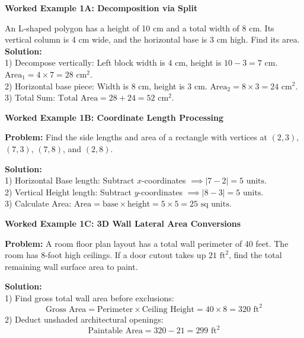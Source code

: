\documentclass[12pt, letterpaper, fleqn]{article}
\begin{document}
\begin{tcolorbox}[colback=white, colframe=black!25, boxrule=0.6pt, arc=4mm, left=6mm, right=6mm, top=4mm, bottom=4mm]
\textbf{Worked Example 1A: Decomposition via Split}

\medskip
\noindent
An L-shaped polygon has a height of 10 cm and a total width of 8 cm. Its vertical column is 4 cm wide, and the horizontal base is 3 cm high. Find its area.\\
\textbf{Solution:} \\
1) Decompose vertically: Left block width is $4\text{ cm}$, height is $10 - 3 = 7\text{ cm}$. $\text{Area}_1 = 4 \times 7 = 28\text{ cm}^2$.\\
2) Horizontal base piece: Width is $8\text{ cm}$, height is $3\text{ cm}$. $\text{Area}_2 = 8 \times 3 = 24\text{ cm}^2$.\\
3) Total Sum: $\text{Total Area} = 28 + 24 = 52\text{ cm}^2$.
\end{tcolorbox}

\vspace{3mm}

\begin{tcolorbox}[colback=white, colframe=black!25, boxrule=0.6pt, arc=4mm, left=6mm, right=6mm, top=4mm, bottom=4mm]
\textbf{Worked Example 1B: Coordinate Length Processing}

\medskip
\noindent
\textbf{Problem:} Find the side lengths and area of a rectangle with vertices at $(2, 3)$, $(7, 3)$, $(7, 8)$, and $(2, 8)$.

\medskip
\noindent
\textbf{Solution:} \\
1) Horizontal Base length: Subtract $x$-coordinates $\implies |7 - 2| = 5\text{ units}$.\\
2) Vertical Height length: Subtract $y$-coordinates $\implies |8 - 3| = 5\text{ units}$.\\
3) Calculate Area: $\text{Area} = \text{base} \times \text{height} = 5 \times 5 = 25\text{ sq units}$.
\end{tcolorbox}

\newpage

\begin{tcolorbox}[colback=white, colframe=black!25, boxrule=0.6pt, arc=4mm, left=6mm, right=6mm, top=4mm, bottom=4mm]
\textbf{Worked Example 1C: 3D Wall Lateral Area Conversions}

\medskip
\noindent
\textbf{Problem:} A room floor plan layout has a total wall perimeter of 40 feet. The room has 8-foot high ceilings. If a door cutout takes up $21\text{ ft}^2$, find the total remaining wall surface area to paint.

\medskip
\noindent
\textbf{Solution:} \\
1) Find gross total wall area before exclusions:
$$\text{Gross Area} = \text{Perimeter} \times \text{Ceiling Height} = 40 \times 8 = 320\text{ ft}^2$$
2) Deduct unshaded architectural openings:
$$\text{Paintable Area} = 320 - 21 = 299\text{ ft}^2$$
\end{tcolorbox}
\end{document}
